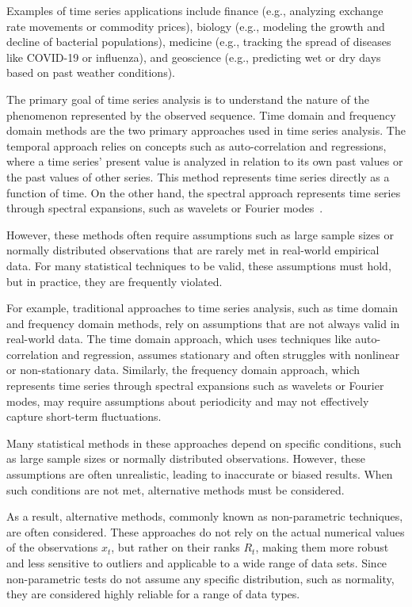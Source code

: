 Examples of time series applications include finance (e.g., analyzing exchange rate movements or commodity prices), biology (e.g., modeling the growth and decline of bacterial populations), medicine (e.g., tracking the spread of diseases like COVID-19 or influenza), and geoscience (e.g., predicting wet or dry days based on past weather conditions).

The primary goal of time series analysis is to understand the nature of the phenomenon represented by the observed sequence. Time domain and frequency domain methods are the two primary approaches used in time series analysis. The temporal approach relies on concepts such as auto-correlation and regressions, where a time series' present value is analyzed in relation to its own past values or the past values of other series. This method represents time series directly as a function of time. On the other hand, the spectral approach represents time series through spectral expansions, such as wavelets or Fourier modes~\cite{treitel1995spectral}.


However, these methods often require assumptions such as large sample sizes or normally distributed observations that are rarely met in real-world empirical data. For many statistical techniques to be valid, these assumptions must hold, but in practice, they are frequently violated.

For example, traditional approaches to time series analysis, such as time domain and frequency domain methods, rely on assumptions that are not always valid in real-world data. The time domain approach, which uses techniques like auto-correlation and regression, assumes stationary and often struggles with nonlinear or non-stationary data. Similarly, the frequency domain approach, which represents time series through spectral expansions such as wavelets or Fourier modes, may require assumptions about periodicity and may not effectively capture short-term fluctuations.

Many statistical methods in these approaches depend on specific conditions, such as large sample sizes or normally distributed observations. However, these assumptions are often unrealistic, leading to inaccurate or biased results. When such conditions are not met, alternative methods must be considered.

As a result, alternative methods, commonly known as non-parametric techniques, are often considered. These approaches do not rely on the actual numerical values of the observations $x_t$, but rather on their ranks $R_t$, making them more robust and less sensitive to outliers and applicable to a wide range of data sets. 
Since non-parametric tests do not assume any specific distribution, such as normality, they are considered highly reliable for a range of data types.

